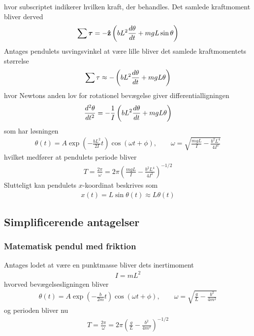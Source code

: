 hvor subscriptet indikerer hvilken kraft, der behandles. Det samlede kraftmoment bliver derved
\begin{align*}
\sum\mbox{\boldmath$ \tau $} = -\mathbf{\hat{z}}\left(bL^2{d{\theta} \over d{t}} + mgL\sin\theta\right)
\end{align*}
Antages pendulets usvingsvinkel at være lille bliver det samlede kraftmomentets størrelse
\begin{align*}
\sum\tau \approx -\left(bL^2{d{\theta} \over d{t}} + mgL\theta\right)
\end{align*}
hvor Newtons anden lov for rotationel bevægelse giver differentialligningen
\begin{align*}
{d^2{\theta} \over d{t}^2} = -\frac{1}{I}\left(bL^2{d{\theta} \over d{t}} + mgL\theta\right)
\end{align*}
som har løsningen
\begin{align*}
\theta(t) = A\exp\left(-\frac{bL^2}{2I}t\right)\cos\left(\omega t + \phi\right), \qquad \omega = \sqrt{\frac{mgL}{I} - \frac{b^2L^4}{4I^2}}
\end{align*}
hvilket medfører at pendulets periode bliver
\begin{align*}
T = \frac{2\pi}{\omega} = 2\pi\left(\frac{mgL}{I} - \frac{b^2L^4}{4I^2}\right)^{-1/2}
\end{align*}
Slutteligt kan pendulets $x$-koordinat beskrives som
\begin{align*}
x(t) = L\sin\theta(t) \approx L\theta(t)
\end{align*}

\subsection*{Simplificerende antagelser}
\subsubsection*{Matematisk pendul med friktion}
Antages lodet at være en punktmasse bliver dets inertimoment
\begin{align*}
I = mL^2
\end{align*}
hvorved  bevægelsesligningen bliver
\begin{align*}
\theta(t) = A\exp\left(-\frac{b}{2m}t\right)\cos\left(\omega t + \phi\right), \qquad \omega = \sqrt{\frac{g}{L} - \frac{b^2}{4m^2}}
\end{align*}
og perioden bliver nu
\begin{align*}
T = \frac{2\pi}{\omega} = 2\pi\left(\frac{g}{L} - \frac{b^2}{4m^2}\right)^{-1/2}
\end{align*}

